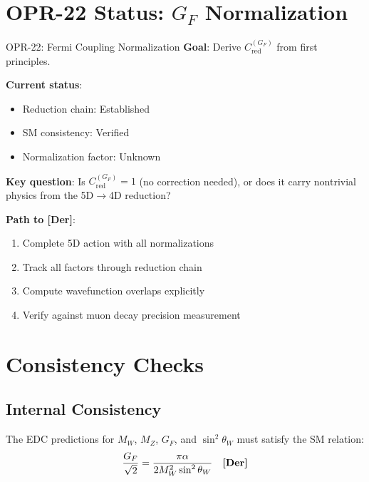 \section{OPR-22 Status: $G_F$ Normalization}
\label{sec:opr22}

\begin{statusbox}{OPR-22: Fermi Coupling Normalization}
\textbf{Goal}: Derive $C_{\text{red}}^{(G_F)}$ from first principles.

\textbf{Current status}:
\begin{itemize}[nosep]
\item Reduction chain: Established \tagDc
\item SM consistency: Verified \tagDer
\item Normalization factor: Unknown \tagOpen
\end{itemize}

\textbf{Key question}:
Is $C_{\text{red}}^{(G_F)} = 1$ (no correction needed), or does it carry
nontrivial physics from the 5D$\to$4D reduction?

\textbf{Path to [Der]}:
\begin{enumerate}[nosep]
\item Complete 5D action with all normalizations
\item Track all factors through reduction chain
\item Compute wavefunction overlaps explicitly
\item Verify against muon decay precision measurement
\end{enumerate}
\end{statusbox}

\section{Consistency Checks}
\label{sec:consistency}

\subsection{Internal Consistency}

The EDC predictions for $M_W$, $M_Z$, $G_F$, and $\sin^2\theta_W$
must satisfy the SM relation:
\begin{equation}
\frac{G_F}{\sqrt{2}} = \frac{\pi\alpha}{2M_W^2\sin^2\theta_W} \quad \textbf{[Der]}
\end{equation}

